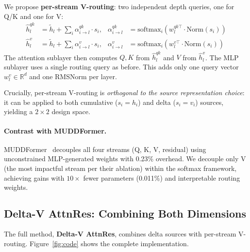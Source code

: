 \documentclass{article}
\begin{document}
We propose \textbf{per-stream V-routing}: two independent depth queries, one for Q/K and one for V:
\begin{align}
    \hat{h}_l^{qk} &= \tilde{h}_l + \sum_{i} \alpha_{i \to l}^{qk} \cdot s_i, &
    \alpha_{i \to l}^{qk} &= \mathrm{softmax}_i(w_l^{qk \top} \cdot \mathrm{Norm}(s_i)) \label{eq:qk_routing} \\
    \hat{h}_l^{v} &= \tilde{h}_l + \sum_{i} \alpha_{i \to l}^{v} \cdot s_i, &
    \alpha_{i \to l}^{v} &= \mathrm{softmax}_i(w_l^{v \top} \cdot \mathrm{Norm}(s_i)) \label{eq:v_routing}
\end{align}
The attention sublayer then computes $Q, K$ from $\hat{h}_l^{qk}$ and $V$ from $\hat{h}_l^{v}$. The MLP sublayer uses a single routing query as before. This adds only one query vector $w_l^v \in \mathbb{R}^d$ and one RMSNorm per layer.

Crucially, per-stream V-routing is \emph{orthogonal to the source representation choice}: it can be applied to both cumulative ($s_i = h_i$) and delta ($s_i = v_i$) sources, yielding a $2 \times 2$ design space.

\paragraph{Contrast with MUDDFormer.} MUDDFormer~\citep{wang2024muddformer} decouples all four streams (Q, K, V, residual) using unconstrained MLP-generated weights with 0.23\% overhead. We decouple only V (the most impactful stream per their ablation) within the softmax framework, achieving gains with $10\times$ fewer parameters (0.011\%) and interpretable routing weights.

\subsection{Delta-V AttnRes: Combining Both Dimensions}
\label{sec:combined}

The full method, \textbf{Delta-V AttnRes}, combines delta sources with per-stream V-routing. Figure~\ref{fig:code} shows the complete implementation.
\end{document}
